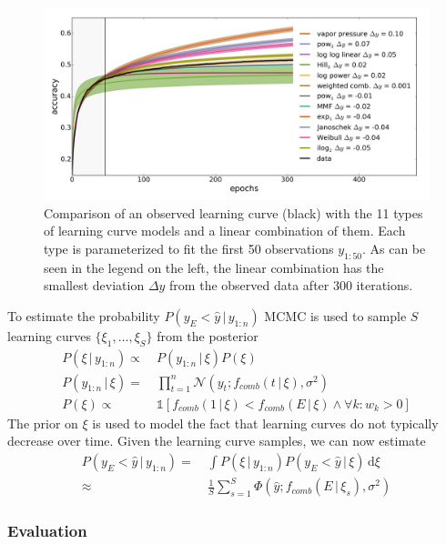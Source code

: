 \begin{figure}
	\centering
	\includegraphics[width=0.75\linewidth]{gfx/earlyterm/models.png}
	\caption{
		Comparison of an observed learning curve (black) with the 11 types of learning curve models and a linear combination of them.
		Each type is parameterized to fit the first 50 observations \(y_{1:50}\).
		As can be seen in the legend on the left, the linear combination has the smallest deviation \(\Delta y\) from the observed data after 300 iterations.
	}\label{fig:earlyterm:models}
\end{figure}

To estimate the probability \(P(y_E < \hat{y}\, |\, y_{1:n})\) MCMC is used to sample \(S\) learning curves \(\{\xi_1, \dots, \xi_S\}\) from the posterior
\begin{align}
	P(\xi\, |\, y_{1:n}) \propto&\ P(y_{1:n}\, |\, \xi) P(\xi) \\
	P(y_{1:n}\, |\, \xi) =&\ \prod_{t = 1}^{n} \mathcal{N}(y_t; f_{\mathit{comb}}(t\, |\, \xi), \sigma^2) \\
	P(\xi) \propto&\ \mathbb{1}[f_{\mathit{comb}}(1\, |\, \xi) < f_{\mathit{comb}}(E\, |\, \xi) \land \forall k: w_k > 0]
\end{align}
The prior on \(\xi\) is used to model the fact that learning curves do not typically decrease over time.
Given the learning curve samples, we can now estimate
\begin{align}
	P(y_E < \hat{y}\, |\, y_{1:n}) =&\ \int P(\xi\, |\, y_{1:n}) P(y_E < \hat{y}\, |\, \xi)\, \mathrm{d}\xi \\
	\approx&\ \frac{1}{S} \sum_{s = 1}^S \Phi(\hat{y}; f_{\mathit{comb}}(E\, |\, \xi_s), \sigma^2) \nonumber
\end{align}

\subsubsection{Evaluation}%
\label{sec:hyperparams:earlyterm:eval}

